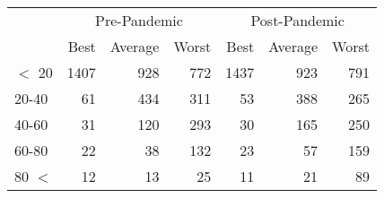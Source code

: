 
\begin{tabular}[t]{lrrrrrr}
\toprule
\multicolumn{1}{c}{ } & \multicolumn{3}{c}{Pre-Pandemic} & \multicolumn{3}{c}{Post-Pandemic} \\
\cmidrule(l{3pt}r{3pt}){2-4} \cmidrule(l{3pt}r{3pt}){5-7}
 & Best & Average & Worst & Best & Average & Worst\\
\midrule
$<$ 20 & 1407 & 928 & 772 & 1437 & 923 & 791\\
20-40 & 61 & 434 & 311 & 53 & 388 & 265\\
40-60 & 31 & 120 & 293 & 30 & 165 & 250\\
60-80 & 22 & 38 & 132 & 23 & 57 & 159\\
80 $<$ & 12 & 13 & 25 & 11 & 21 & 89\\
\bottomrule
\end{tabular}
